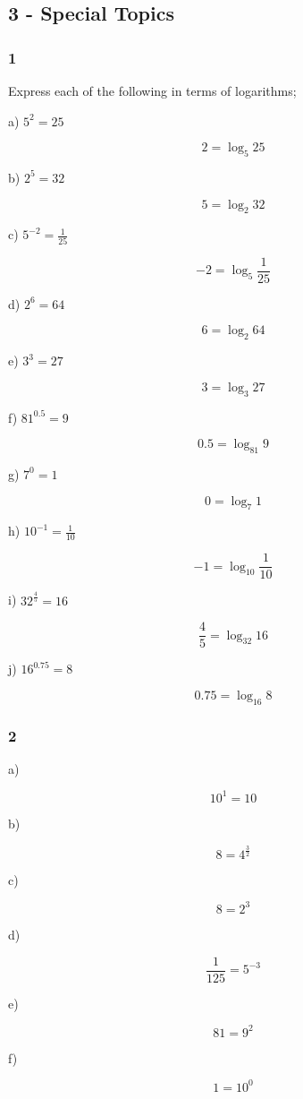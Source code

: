 \documentclass[]{report}
\begin{document}
\subsection{3 - Special Topics}

\subsubsection{1}

Express each of the following in terms of logarithms;

a) $5^2 = 25$

\[
2 = \log_5 {25}
\]

b) $2^5  = 32$

\[
5 = \log_2 32
\]

c) $5^{-2} = \frac{1}{25}$

\[
-2 = \log_5 \frac{1}{25}
\]

d) $2^6 = 64$

\[
6 = \log_2 64
\]

e) $3^3 = 27$

\[
3 = \log_3 27
\]

f) $81^{0.5} = 9$

\[
0.5 = \log_{81} 9
\]

g) $7^0 =1$

\[
0 = \log_7 1
\]

h) $10^{-1} = \frac{1}{10}$

\[
-1 = \log_{10} \frac{1}{10}
\]

i) $32^{\frac{4}{5}} = 16$

\[
\frac{4}{5} = \log_{32} 16
\]

j) $16^{0.75} = 8$

\[
0.75 = \log_{16} 8
\]

\subsubsection{2}

a)

\[
10^1 = 10
\]

b)

\[
8 = 4^{\frac{3}{2}}
\]


c)

\[
8 = 2^3
\]

d)

\[
\frac{1}{125} = 5^{-3}
\]

e)

\[
81 = 9^2
\]

f)

\[
1 = 10^0
\]
\end{document}
